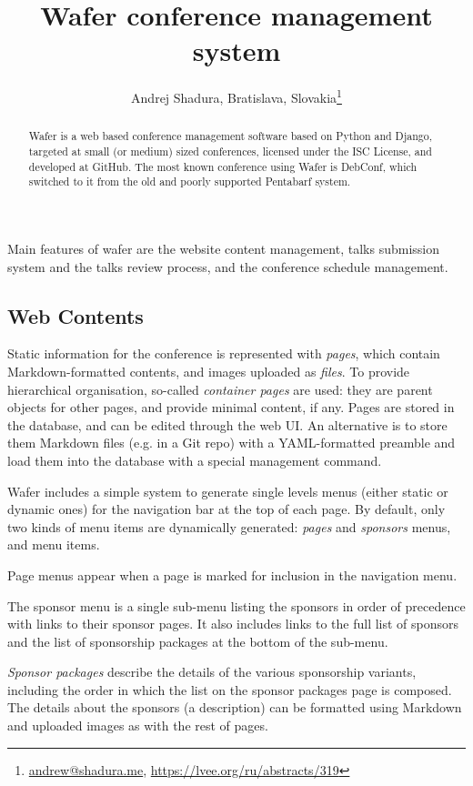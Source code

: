 \documentclass[10pt, a5paper]{article}
\begin{document}
\title{Wafer conference management system}
\author{Andrej Shadura, Bratislava, Slovakia\footnote{\url{andrew@shadura.me}, \url {https://lvee.org/ru/abstracts/319}}}
\maketitle
\begin{abstract}
Wafer is a web based conference management software based on Python and Django, targeted at small (or medium) sized conferences, licensed under the ISC License, and developed at GitHub. The most known conference using Wafer is DebConf, which switched to it from the old and poorly supported Pentabarf system.
\end{abstract}
Main features of wafer are the website content management, talks submission system and the talks review process, and the conference schedule management.

\subsection*{Web Contents}

Static information for the conference is represented with \emph{pages}, which contain Markdown-formatted contents, and images uploaded as \emph{files}. To provide hierarchical organisation, so-called \emph{container pages} are used: they are parent objects for other pages, and provide minimal content, if any. Pages are stored in the database, and can be edited through the web UI. An alternative is to store them Markdown files (e.g. in a Git repo) with a YAML-formatted preamble and load them into the database with a special management command.

Wafer includes a simple system to generate single levels menus (either static or dynamic ones) for the navigation bar at the top of each page. By default, only two kinds of menu items are dynamically generated: \emph{pages} and \emph{sponsors} menus, and menu items.

Page menus appear when a page is marked for inclusion in the navigation menu.

The sponsor menu is a single sub-menu listing the sponsors in order of precedence with links to their sponsor pages. It also includes links to the full list of sponsors and the list of sponsorship packages at the bottom of the sub-menu.

\emph{Sponsor packages} describe the details of the various sponsorship variants, including the order in which the list on the sponsor packages page is composed. The details about the sponsors (a description) can be formatted using Markdown and uploaded images as with the rest of pages.
\end{document}
